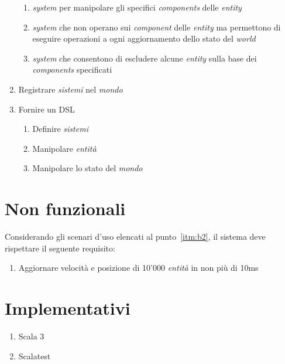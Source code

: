 \begin{enumerate}[label=\textbf{\ref{sec:funzionali}.\arabic*}]
    \begin{enumerate}[label=\textbf{\ref{itm:f7}.\arabic*}]
        \item \label{itm:ff7} \textit{system} per manipolare gli specifici \textit{components} delle \textit{entity}
        \item \label{itm:ff10} \textit{system} che non operano sui \textit{component} delle \textit{entity} ma permettono di eseguire operazioni a ogni aggiornamento dello stato del \textit{world}
        \item \label{itm:ff11} \textit{system} che consentono di escludere alcune \textit{entity} sulla base dei \textit{components} specificati
    \end{enumerate}
    \item \label{itm:f8} Registrare \textit{sistemi} nel \textit{mondo}
    \item \label{itm:f9} Fornire un DSL
    \begin{enumerate}[label=\textbf{\ref{itm:f9}.\arabic*}]
        \item \label{itm:ff12} Definire \textit{sistemi}
        \item \label{itm:ff13} Manipolare \textit{entità}
        \item \label{itm:ff14} Manipolare lo stato del \textit{mondo}
    \end{enumerate}
\end{enumerate}


\section{Non funzionali}\label{sec:non-funzionali}
Considerando gli scenari d'uso elencati al punto~\ref{itm:b2}, il sistema deve rispettare il seguente requisito:
\begin{enumerate}[label=\textbf{\ref{sec:non-funzionali}.\arabic*}]
    \item \label{itm:nf1} Aggiornare velocità e posizione di 10'000 \textit{entità} in non più di 10ms
\end{enumerate}


\section{Implementativi}\label{sec:implementativi}
\begin{enumerate}[label=\textbf{\ref{sec:implementativi}.\arabic*}]
    \item \label{itm:i1} Scala 3
    \item \label{itm:i2} Scalatest\cite{scalatest}
\end{enumerate}